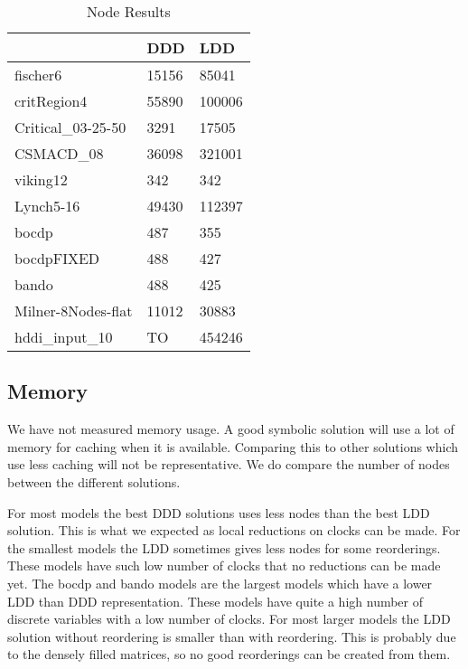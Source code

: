 \begin{table}

    \begin{tabular}{|l|l|l|}
    \hline
                       & DDD   & LDD    \\ \hline
    fischer6           & 15156 & 85041  \\
    critRegion4        & 55890 & 100006 \\
    Critical\_03-25-50 & 3291  & 17505  \\
    CSMACD\_08         & 36098 & 321001 \\
    viking12           & 342   & 342    \\
    Lynch5-16          & 49430 & 112397 \\
    bocdp              & 487   & 355    \\
    bocdpFIXED         & 488   & 427    \\
    bando              & 488   & 425    \\
    Milner-8Nodes-flat & 11012 & 30883  \\
    hddi\_input\_10    & TO    & 454246 \\ \hline
    \end{tabular}
\caption{Node Results}
\label{tab:node_results}
\end{table}

\subsection{Memory}
We have not measured memory usage. A good symbolic solution will use a lot of memory for caching when it is available. Comparing this to other solutions which use less caching will not be representative. We do compare the number of nodes between the different solutions. 

For most models the best DDD solutions uses less nodes than the best LDD solution. This is what we expected as local reductions on clocks can be made. For the smallest models the LDD sometimes gives less nodes for some reorderings. These models have such low number of clocks that no reductions can be made yet. The bocdp and bando models are the largest models which have a lower LDD than DDD representation. These models have quite a high number of discrete variables with a low number of clocks. For most larger models the LDD solution without reordering is smaller than with reordering. This is probably due to the densely filled matrices, so no good reorderings can be created from them.

